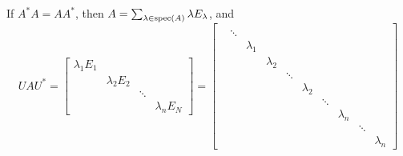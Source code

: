 If $A^*A = AA^*$, then $A = \sum_{\lambda\in\operatorname{spec}(A)}\lambda E_{\lambda}$, and
\[UAU^* =
    \begin{bmatrix}
        \lambda_1 E_1                             \\
         & \lambda_2 E_2                          \\
         &               & \ddots                 \\
         &               &        & \lambda_n E_N
    \end{bmatrix}
    =
    \begin{bmatrix}                                                                \\
         & \ddots                                                                                        \\
         &        & \lambda_1                                                                            \\
         &        &           & \lambda_2                                                                \\
         &        &           &           & \ddots                                                       \\
         &        &           &           &        & \lambda_2                                           \\
         &        &           &           &        &           & \ddots                                  \\
         &        &           &           &        &           &        & \lambda_n                      \\
         &        &           &           &        &           &        &           & \ddots             \\
         &        &           &           &        &           &        &           &        & \lambda_n
    \end{bmatrix}
\]


